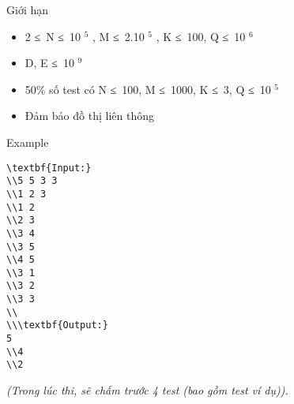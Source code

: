 Giới hạn
\begin{itemize}
	\item     2 ≤ N ≤ 10    $^     5    $    , M ≤ 2.10    $^     5    $    , K ≤ 100, Q ≤ 10    $^     6    $
	\item     D, E ≤ 10    $^     9    $
	\item     50\% số test có N ≤ 100, M ≤ 1000, K ≤ 3, Q ≤ 10    $^     5    $
	\item     Đảm bảo đồ thị liên thông   
\end{itemize}
Example
\begin{verbatim}
\textbf{Input:}
\\5 5 3 3
\\1 2 3
\\1 2
\\2 3
\\3 4
\\3 5
\\4 5
\\3 1
\\3 2
\\3 3
\\
\\\textbf{Output:}
5
\\4
\\2\end{verbatim}

\emph{    (Trong lúc thi, sẽ chấm trước 4 test (bao gồm test ví dụ)).   }